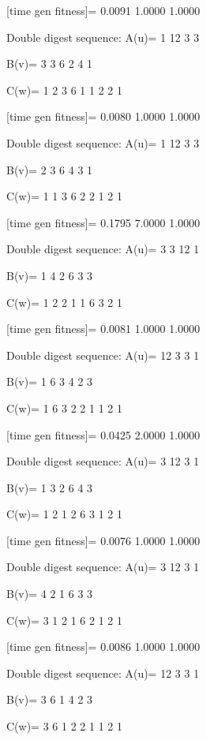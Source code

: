 [time gen fitness]=
    0.0091    1.0000    1.0000

Double digest sequence:
A(u)=
     1    12     3     3

B(v)=
     3     3     6     2     4     1

C(w)=
     1     2     3     6     1     1     2     2     1

[time gen fitness]=
    0.0080    1.0000    1.0000

Double digest sequence:
A(u)=
     1    12     3     3

B(v)=
     2     3     6     4     3     1

C(w)=
     1     1     3     6     2     2     1     2     1

[time gen fitness]=
    0.1795    7.0000    1.0000

Double digest sequence:
A(u)=
     3     3    12     1

B(v)=
     1     4     2     6     3     3

C(w)=
     1     2     2     1     1     6     3     2     1

[time gen fitness]=
    0.0081    1.0000    1.0000

Double digest sequence:
A(u)=
    12     3     3     1

B(v)=
     1     6     3     4     2     3

C(w)=
     1     6     3     2     2     1     1     2     1

[time gen fitness]=
    0.0425    2.0000    1.0000

Double digest sequence:
A(u)=
     3    12     3     1

B(v)=
     1     3     2     6     4     3

C(w)=
     1     2     1     2     6     3     1     2     1

[time gen fitness]=
    0.0076    1.0000    1.0000

Double digest sequence:
A(u)=
     3    12     3     1

B(v)=
     4     2     1     6     3     3

C(w)=
     3     1     2     1     6     2     1     2     1

[time gen fitness]=
    0.0086    1.0000    1.0000

Double digest sequence:
A(u)=
    12     3     3     1

B(v)=
     3     6     1     4     2     3

C(w)=
     3     6     1     2     2     1     1     2     1

